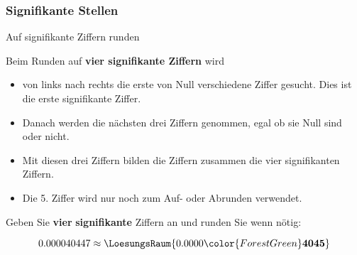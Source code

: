 


\newpage

\subsubsection{Signifikante Stellen}
\begin{rezept}{Auf signifikante Ziffern runden}{}
  
  Beim Runden auf \textbf{vier signifikante Ziffern} wird
  \begin{itemize}
  \item  von links nach rechts die erste von Null verschiedene Ziffer gesucht. Dies ist die
    erste signifikante Ziffer.
  \item
    Danach werden die nächsten drei Ziffern
  genommen, egal ob sie Null sind oder nicht. 
\item   Mit diesen drei Ziffern bilden die Ziffern zusammen die vier
  signifikanten Ziffern.
\item  Die 5. Ziffer wird nur noch zum Auf- oder Abrunden verwendet.
  \end{itemize}
\end{rezept}

Geben Sie {\color{ForestGreen}\textbf{vier}} \textbf{signifikante} Ziffern an und runden Sie wenn nötig:

$$0.000040447  \approx \LoesungsRaum{0.0000{\color{ForestGreen}\mathbf{4045}}}$$




